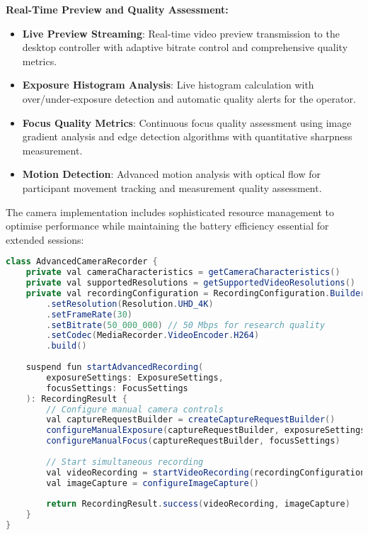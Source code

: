 \documentclass[11pt,a4paper]{report}
\begin{document}
\textbf{Real-Time Preview and Quality Assessment:}
\begin{itemize}
  \item \textbf{Live Preview Streaming}: Real-time video preview transmission to the desktop controller with adaptive bitrate control and comprehensive quality metrics.
  \item \textbf{Exposure Histogram Analysis}: Live histogram calculation with over/under-exposure detection and automatic quality alerts for the operator.
  \item \textbf{Focus Quality Metrics}: Continuous focus quality assessment using image gradient analysis and edge detection algorithms with quantitative sharpness measurement.
  \item \textbf{Motion Detection}: Advanced motion analysis with optical flow for participant movement tracking and measurement quality assessment.
\end{itemize}

The camera implementation includes sophisticated resource management to optimise performance while maintaining the battery efficiency essential for extended sessions:

\begin{lstlisting}[language=Java]
class AdvancedCameraRecorder {
    private val cameraCharacteristics = getCameraCharacteristics()
    private val supportedResolutions = getSupportedVideoResolutions()
    private val recordingConfiguration = RecordingConfiguration.Builder()
        .setResolution(Resolution.UHD_4K)
        .setFrameRate(30)
        .setBitrate(50_000_000) // 50 Mbps for research quality
        .setCodec(MediaRecorder.VideoEncoder.H264)
        .build()
    
    suspend fun startAdvancedRecording(
        exposureSettings: ExposureSettings,
        focusSettings: FocusSettings
    ): RecordingResult {
        // Configure manual camera controls
        val captureRequestBuilder = createCaptureRequestBuilder()
        configureManualExposure(captureRequestBuilder, exposureSettings)
        configureManualFocus(captureRequestBuilder, focusSettings)
        
        // Start simultaneous recording
        val videoRecording = startVideoRecording(recordingConfiguration)
        val imageCapture = configureImageCapture()
        
        return RecordingResult.success(videoRecording, imageCapture)
    }
}
\end{lstlisting}
\end{document}
